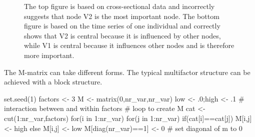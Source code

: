 \documentclass[
  a4paper,
  DIV=11,
  numbers=noendperiod,
  oneside]{scrreprt}
\newenvironment{Shaded}{}{}
\newcommand{\CommentTok}[1]{\textcolor[rgb]{0.42,0.45,0.49}{#1}}
\newcommand{\ControlFlowTok}[1]{\textcolor[rgb]{0.84,0.23,0.29}{#1}}
\newcommand{\DecValTok}[1]{\textcolor[rgb]{0.00,0.36,0.77}{#1}}
\newcommand{\FunctionTok}[1]{\textcolor[rgb]{0.44,0.26,0.76}{#1}}
\newcommand{\NormalTok}[1]{\textcolor[rgb]{0.14,0.16,0.18}{#1}}
\newcommand{\OtherTok}[1]{\textcolor[rgb]{0.44,0.26,0.76}{#1}}
\newcommand{\SpecialCharTok}[1]{\textcolor[rgb]{0.00,0.36,0.77}{#1}}
\begin{document}
\begin{figure}


\caption{\label{fig-ch6-img16-old-85}The top figure is based on
cross-sectional data and incorrectly suggests that node V2 is the most
important node. The bottom figure is based on the time series of one
individual and correctly shows that V2 is central because it is
influenced by other nodes, while V1 is central because it influences
other nodes and is therefore more important.}

\end{figure}%

The M-matrix can take different forms. The typical multifactor structure
can be achieved with a block structure.

\begin{Shaded}
\begin{Highlighting}[]
\FunctionTok{set.seed}\NormalTok{(}\DecValTok{1}\NormalTok{)}
\NormalTok{factors }\OtherTok{\textless{}{-}} \DecValTok{3}
\NormalTok{M }\OtherTok{\textless{}{-}} \FunctionTok{matrix}\NormalTok{(}\DecValTok{0}\NormalTok{,nr\_var,nr\_var)}
\NormalTok{low }\OtherTok{\textless{}{-}}\NormalTok{ .}\DecValTok{0}\NormalTok{;high }\OtherTok{\textless{}{-}}\NormalTok{ .}\DecValTok{1} \CommentTok{\# interaction between and within factors}
\CommentTok{\# loop to create M}
\NormalTok{cat }\OtherTok{\textless{}{-}} \FunctionTok{cut}\NormalTok{(}\DecValTok{1}\SpecialCharTok{:}\NormalTok{nr\_var,factors)}
\ControlFlowTok{for}\NormalTok{(i }\ControlFlowTok{in} \DecValTok{1}\SpecialCharTok{:}\NormalTok{nr\_var)}
  \ControlFlowTok{for}\NormalTok{(j }\ControlFlowTok{in} \DecValTok{1}\SpecialCharTok{:}\NormalTok{nr\_var)}
    \ControlFlowTok{if}\NormalTok{(cat[i]}\SpecialCharTok{==}\NormalTok{cat[j]) M[i,j] }\OtherTok{\textless{}{-}}\NormalTok{ high }\ControlFlowTok{else}\NormalTok{ M[i,j] }\OtherTok{\textless{}{-}}\NormalTok{ low}
\NormalTok{M[}\FunctionTok{diag}\NormalTok{(nr\_var)}\SpecialCharTok{==}\DecValTok{1}\NormalTok{] }\OtherTok{\textless{}{-}} \DecValTok{0} \CommentTok{\# set diagonal of m to 0}
\end{Highlighting}
\end{Shaded}
\end{document}
